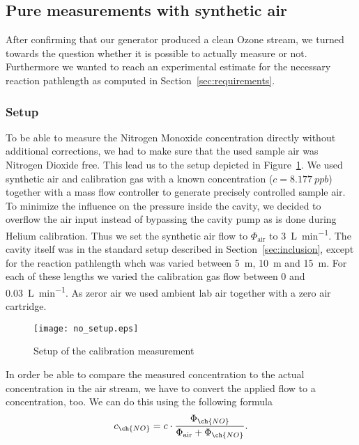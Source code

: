 \subsection{Pure  measurements with synthetic air}
\label{sec:no}

After confirming that our generator produced a clean Ozone stream, we
turned towards the question whether it is possible to actually measure
 or not. Furthermore we wanted to reach an experimental
estimate for the necessary reaction pathlength as computed in
Section~\ref{sec:requirements}.

\subsubsection{Setup}
\label{sec:no-setup}

To be able to measure the Nitrogen
Monoxide concentration directly without additional corrections, we had
to make sure that the used sample air was Nitrogen Dioxide free. This
lead us to the setup depicted in Figure~\ref{fig:no-setup}. We used
synthetic air and  calibration gas with a known  concentration ($c
= \SI{8.177}{ppb}$) together with a mass flow controller to generate
precisely controlled sample air. To minimize the influence on the
pressure inside the cavity, we decided to overflow the air input
instead of bypassing the cavity pump as is done during Helium
calibration. Thus we set the synthetic air flow to $\Phi_{\text{air}}$
to \SI{3}{\liter\per\minute}. The cavity itself was in the standard
setup described in Section~\ref{sec:inclusion}, except for the
reaction pathlength whch was varied between \SI{5}{\meter},
\SI{10}{\meter} and \SI{15}{\meter}. For each of these lengths we
varied the  calibration gas flow between \num{0} and
\SI{0.03}{\liter\per\minute}. As zeror air we used ambient lab air
together with a zero air cartridge.

\begin{figure}[htbp]
  \centering
  \texttt{[image: no\_setup.eps]}
  \caption{Setup of the calibration measurement}
  \label{fig:no-setup}
\end{figure}

In order be able to compare the measured  concentration to the
actual concentration in the air stream, we have to convert the applied
 flow to a concentration, too. We can do this using the
following formula
\begin{align}
  c_{\ch{NO}} = c \cdot \frac{\Phi_{\ch{NO}}}{\Phi_{\text{air}} +
  \Phi_{\ch{NO}}}. \label{eq:c-flow}
\end{align}

